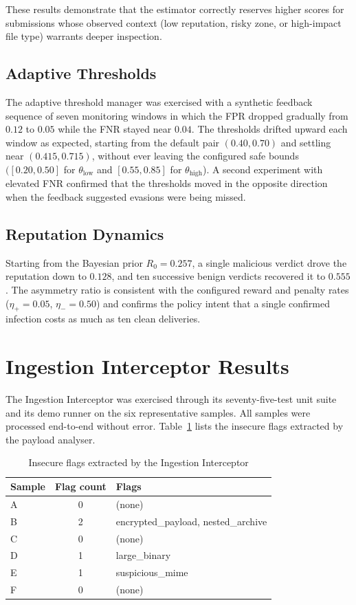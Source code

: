 \documentclass[12pt, a4paper]{report}
\begin{document}
These results demonstrate that the estimator correctly reserves higher
scores for submissions whose observed context (low reputation, risky
zone, or high-impact file type) warrants deeper inspection.

\subsection{Adaptive Thresholds}

The adaptive threshold manager was exercised with a synthetic
feedback sequence of seven monitoring windows in which the FPR
dropped gradually from $0.12$ to $0.05$ while the FNR stayed near
$0.04$. The thresholds drifted upward each window as expected,
starting from the default pair $(0.40, 0.70)$ and settling near
$(0.415, 0.715)$, without ever leaving the configured safe bounds
$([0.20, 0.50]$ for $\theta_{\text{low}}$ and $[0.55, 0.85]$ for
$\theta_{\text{high}}$). A second experiment with elevated FNR
confirmed that the thresholds moved in the opposite direction when
the feedback suggested evasions were being missed.

\subsection{Reputation Dynamics}

Starting from the Bayesian prior $R_0 = 0.257$, a single malicious
verdict drove the reputation down to $0.128$, and ten successive
benign verdicts recovered it to $0.555$. The asymmetry ratio is
consistent with the configured reward and penalty rates
($\eta_+ = 0.05$, $\eta_- = 0.50$) and confirms the policy intent
that a single confirmed infection costs as much as ten clean
deliveries.

\section{Ingestion Interceptor Results}

The Ingestion Interceptor was exercised through its
seventy-five-test unit suite and its demo runner on the six
representative samples. All samples were processed end-to-end without
error. Table~\ref{tab:ii_flags} lists the insecure flags extracted by
the payload analyser.

\begin{table}[H]
\centering
\caption{Insecure flags extracted by the Ingestion Interceptor}
\label{tab:ii_flags}
\begin{tabular}{@{}lcl@{}}
\toprule
\textbf{Sample} & \textbf{Flag count} & \textbf{Flags} \\
\midrule
A & 0 & (none) \\
B & 2 & encrypted\_payload, nested\_archive \\
C & 0 & (none) \\
D & 1 & large\_binary \\
E & 1 & suspicious\_mime \\
F & 0 & (none) \\
\bottomrule
\end{tabular}
\end{table}
\end{document}
